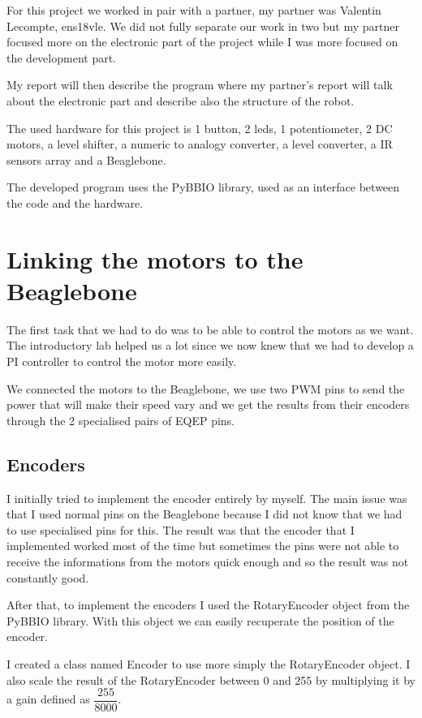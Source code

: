For this project we worked in pair with a partner, my partner was Valentin Lecompte, ens18vle.
We did not fully separate our work in two but my partner focused more on the electronic part of the project while I was more focused on the development part. 

My report will then describe the program where my partner's report will talk about the electronic part and describe also the structure of the robot.

The used hardware for this project is 1 button, 2 leds, 1 potentiometer, 2 DC motors, a level shifter, a numeric to analogy converter, a level converter, a IR sensors array and a Beaglebone.

The developed program uses the PyBBIO library, used as an interface between the code and the hardware.

\section*{Linking the motors to the Beaglebone}

The first task that we had to do was to be able to control the motors as we want.
The introductory lab helped us a lot since we now knew that we had to develop a PI controller to control the motor more easily.

We connected the motors to the Beaglebone, we use two PWM pins to send the power that will make their speed vary and we get the results from their encoders through the 2 specialised pairs of EQEP pins.

\subsection*{Encoders}

I initially tried to implement the encoder entirely by myself.
The main issue was that I used normal pins on the Beaglebone because I did not know that we had to use specialised pins for this.
The result was that the encoder that I implemented worked most of the time but sometimes the pins were not able to receive the informations from the motors quick enough and so the result was not constantly good.

After that, to implement the encoders I used the RotaryEncoder object from the PyBBIO library.
With this object we can easily recuperate the position of the encoder.

I created a class named Encoder to use more simply the RotaryEncoder object.
I also scale the result of the RotaryEncoder between 0 and 255 by multiplying it by a gain defined as $\dfrac{255}{8000}$.

